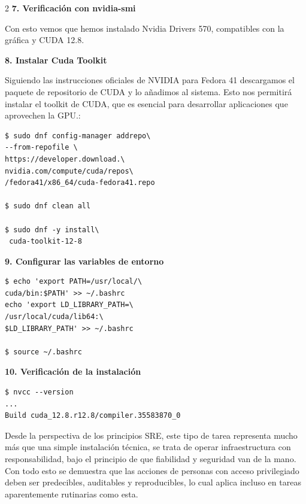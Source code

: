 \begin{multicols*}{2}
\noindent\textbf{7. Verificación con nvidia-smi}
    
Con esto vemos que hemos instalado Nvidia Drivers 570, compatibles con la gráfica y CUDA 12.8.

\vspace{\baselineskip}

\noindent\textbf{8. Instalar Cuda Toolkit}
    
Siguiendo las instrucciones oficiales de NVIDIA para Fedora 41 descargamos el paquete de repositorio de CUDA y lo añadimos al sistema. Esto nos permitirá instalar el toolkit de CUDA, que es esencial para desarrollar aplicaciones que aprovechen la GPU.:

\begin{verbatim}
$ sudo dnf config-manager addrepo\
--from-repofile \
https://developer.download.\
nvidia.com/compute/cuda/repos\
/fedora41/x86_64/cuda-fedora41.repo

$ sudo dnf clean all
    
$ sudo dnf -y install\
 cuda-toolkit-12-8
\end{verbatim}

\noindent\textbf{9. Configurar las variables de entorno}
\begin{verbatim}
$ echo 'export PATH=/usr/local/\
cuda/bin:$PATH' >> ~/.bashrc
echo 'export LD_LIBRARY_PATH=\
/usr/local/cuda/lib64:\
$LD_LIBRARY_PATH' >> ~/.bashrc

$ source ~/.bashrc
\end{verbatim}
\vspace{\baselineskip}

\noindent\textbf{10. Verificación de la instalación}
\begin{verbatim}
$ nvcc --version
... 
Build cuda_12.8.r12.8/compiler.35583870_0
\end{verbatim}


Desde la perspectiva de los principios SRE, este tipo de tarea representa mucho más que una simple instalación técnica, se trata de operar infraestructura con responsabilidad, bajo el principio de que fiabilidad y seguridad van de la mano. Con todo esto se demuestra que las acciones de personas con acceso privilegiado deben ser predecibles, auditables y reproducibles, lo cual aplica incluso en tareas aparentemente rutinarias como esta.


\end{multicols*}
